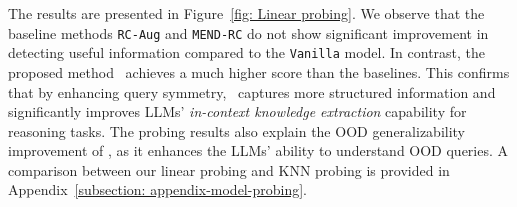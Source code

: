 The results are presented in Figure~\ref{fig: Linear probing}. We observe that the baseline methods \texttt{RC-Aug} and \texttt{MEND-RC} do not show significant improvement in detecting useful information compared to the \texttt{Vanilla} model.  
In contrast, the proposed method \method\ achieves a much higher score than the baselines. This confirms that by enhancing query symmetry, \method\ captures more structured information and significantly improves LLMs' \textit{in-context knowledge extraction} capability for reasoning tasks. The probing results also explain the OOD generalizability improvement of \method, as it enhances the LLMs' ability to understand OOD queries. A comparison between our linear probing and KNN probing is provided in Appendix~\ref{subsection: appendix-model-probing}.















